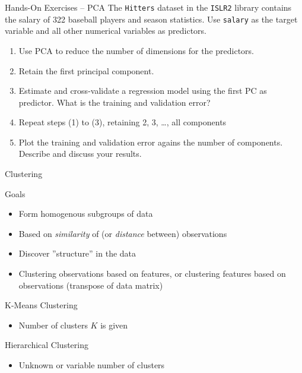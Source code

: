 \documentclass[ignorenonframetext,xcolor=x11names]{beamer}
\begin{document}
\begin{frame}{Hands-On Exercises -- PCA}
The \texttt{Hitters} dataset in the \texttt{ISLR2} library contains the salary of 322 baseball players and season statistics. Use \texttt{salary} as the target variable and all other numerical variables as predictors. 

\begin{enumerate}
   \item Use PCA to reduce the number of dimensions for the predictors.
   \item Retain the first principal component.
   \item Estimate and cross-validate a regression model using the first PC as predictor. What is the training and validation error?
   \item Repeat steps (1) to (3), retaining 2, 3, \ldots, all components
   \item Plot the training and validation error agains the number of components. Describe and discuss your results.
\end{enumerate}
\end{frame}


\begin{frame}{Clustering}
\begin{block}{Goals}
\begin{itemize}
   \item Form homogenous subgroups of data
   \item Based on \emph{similarity} of (or \emph{distance} between) observations
   \item Discover ''structure'' in the data
   \item Clustering observations based on features, or clustering features based on observations (transpose of data matrix)
\end{itemize}
\end{block}
\begin{block}{K-Means Clustering}
\begin{itemize}
   \item Number of clusters $K$ is given 
\end{itemize}
\end{block}
\begin{block}{Hierarchical Clustering}
\begin{itemize}
   \item Unknown or variable number of clusters
\end{itemize}
\end{block}
\end{frame}
\end{document}
